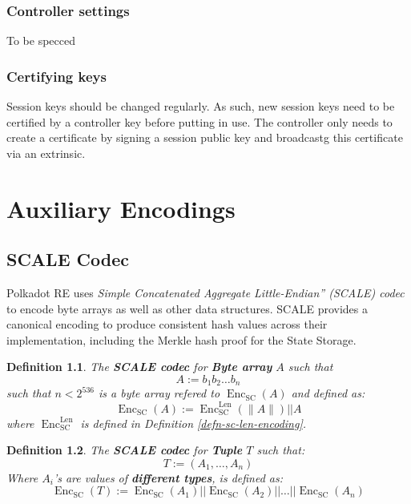 \documentclass{book}
\newcommand{\assign}{:=}
\newcommand{\tmem}[1]{{\em #1\/}}
\newcommand{\tmop}[1]{\ensuremath{\operatorname{#1}}}
\newcommand{\tmstrong}[1]{\textbf{#1}}
\newcommand{\tmtextbf}[1]{{\bfseries{#1}}}
\newcommand{\tmtextit}[1]{{\itshape{#1}}}
\newtheorem{definition}{Definition}
\providecommand{\tmem}[1]{\tmtextit{#1}}
\providecommand{\tmop}[1]{\ensuremath{\mathrm{#1}}}
\providecommand{\tmstrong}[1]{\tmtextbf{#1}}
\providecommand{\tmtextbf}[1]{\tmtextbf{#1}}
\providecommand{\tmtextit}[1]{\tmtextit{#1}}
\newtheorem{definition}{Definition}
\begin{document}
\subsection{Controller settings}\label{sect-controller-settings}

To be specced

\subsection{Certifying keys}\label{sect-certifying-keys}

Session keys should be changed regularly. As such, new session keys need to be
certified by a controller key before putting in use. The controller only needs
to create a certificate by signing a session public key and broadcastg this
certificate via an extrinsic. {}\chapter{Auxiliary Encodings}\label{sect-encoding}

\section{SCALE Codec}\label{sect-scale-codec}

Polkadot RE uses {\tmem{Simple Concatenated Aggregate Little-Endian'' (SCALE)
codec}} to encode byte arrays as well as other data structures. SCALE provides
a canonical encoding to produce consistent hash values across their
implementation, including the Merkle hash proof for the State Storage.

\begin{definition}
  \label{defn-scale-byte-array}The {\tmstrong{SCALE codec}} for
  {\tmstrong{Byte array}} $A$ such that
  \[ A \assign b_1 b_2 \ldots b_n \]
  such that $n < 2^{536}$ is a byte array refered to $\tmop{Enc}_{\tmop{SC}}
  (A)$ and defined as:
  \[ \tmop{Enc}_{\tmop{SC}} (A) \assign \tmop{Enc}^{\tmop{Len}}_{\tmop{SC}}
     (\| A \|) | | A \]
  where $\tmop{Enc}_{\tmop{SC}}^{\tmop{Len}}$ is defined in Definition
  \ref{defn-sc-len-encoding}. 
\end{definition}

\begin{definition}
  \label{defn-scale-tuple}The {\tmstrong{SCALE codec}} for {\tmstrong{Tuple}}
  $T$ such that:
  \[ T \assign (A_1, \ldots, A_n) \]
  Where $A_i$'s are values of {\tmstrong{different types}}, is defined as:
  \[ \tmop{Enc}_{\tmop{SC}} (T) \assign \tmop{Enc}_{\tmop{SC}} (A_1) | |
     \tmop{Enc}_{\tmop{SC}} (A_2) | | \ldots | | \tmop{Enc}_{\tmop{SC}} (A_n)
  \]
\end{definition}
\end{document}
